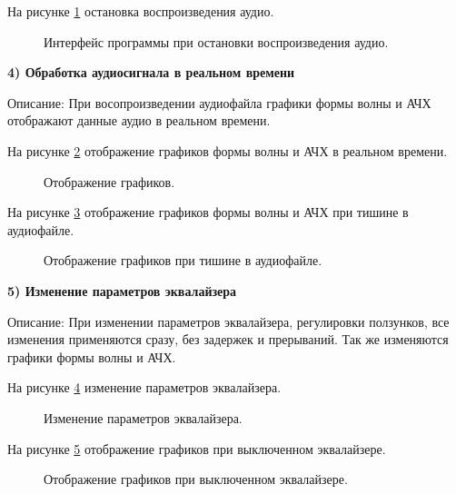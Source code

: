 На рисунке \ref{Stop:image} остановка воспроизведения аудио.

\begin{figure}[ht]
	\caption{Интерфейс программы при остановки воспроизведения аудио.}
	\label{Stop:image}
\end{figure}
\clearpage

\textbf{4) Обработка аудиосигнала в реальном времени}

Описание: При восопроизведении аудиофайла графики формы волны и АЧХ отображают данные аудио в реальном времени.

На рисунке \ref{Graph:image} отображение графиков формы волны и АЧХ в реальном времени.

\begin{figure}[ht]
	\caption{Отображение графиков.}
	\label{Graph:image}
\end{figure}

На рисунке \ref{GraphSilence:image} отображение графиков формы волны и АЧХ при тишине в аудиофайле.

\begin{figure}[ht]
	\caption{Отображение графиков при тишине в аудиофайле.}
	\label{GraphSilence:image}
\end{figure}
\clearpage

\textbf{5) Изменение параметров эквалайзера}

Описание: При изменении параметров эквалайзера, регулировки ползунков, все изменения применяются сразу, без задержек и прерываний. Так же изменяются графики формы волны и АЧХ.

На рисунке \ref{EQParam:image} изменение параметров эквалайзера.

\begin{figure}[ht]
	\caption{Изменение параметров эквалайзера.}
	\label{EQParam:image}
\end{figure}

На рисунке \ref{EQParamOff:image} отображение графиков при выключенном эквалайзере.

\begin{figure}[ht]
	\caption{Отображение графиков при выключенном эквалайзере.}
	\label{EQParamOff:image}
\end{figure}
\clearpage

